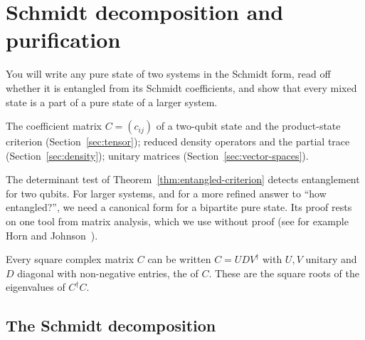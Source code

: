 \section{Schmidt decomposition and purification}\label{sec:schmidt}

\begin{objectives}
  You will write any pure state of two systems in the Schmidt form, read off whether it is entangled from its
  Schmidt coefficients, and show that every mixed state is a part of a pure state of a larger system.
\end{objectives}

\begin{recall}
  The coefficient matrix $C=(c_{ij})$ of a two-qubit state and the product-state criterion (Section~\ref{sec:tensor}); reduced density operators and the partial trace (Section~\ref{sec:density}); unitary matrices (Section~\ref{sec:vector-spaces}).
\end{recall}

The determinant test of Theorem~\ref{thm:entangled-criterion} detects entanglement for two qubits. For larger systems, and for a more refined answer to ``how entangled?'', we need a canonical form for a bipartite pure state. Its proof rests on one tool from matrix analysis,
which we use without proof (see for example Horn and Johnson~\cite{horn2013}).

\begin{theorem}\label{thm:svd}
  Every square complex matrix $C$ can be written $C=UDV^\dagger$ with $U,V$ unitary and $D$ diagonal with non-negative entries, the  of $C$. These are the square roots of the eigenvalues of $C^\dagger C$.
\end{theorem}

\subsection{The Schmidt decomposition}

